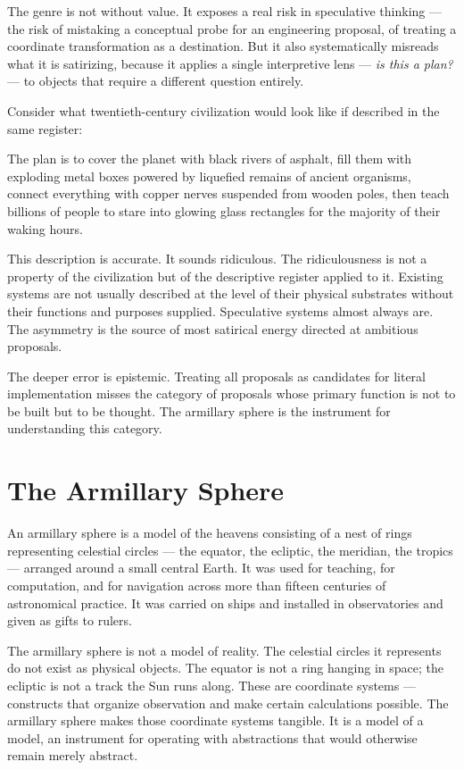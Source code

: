 \documentclass[12pt, a4paper]{article}
\theoremstyle{named}
\begin{document}
The genre is not without value. It exposes a real risk in speculative
thinking — the risk of mistaking a conceptual probe for an engineering
proposal, of treating a coordinate transformation as a destination. But
it also systematically misreads what it is satirizing, because it
applies a single interpretive lens — \emph{is this a plan?} — to
objects that require a different question entirely.

Consider what twentieth-century civilization would look like if
described in the same register:

\begin{keybox}
The plan is to cover the planet with black rivers of asphalt, fill them
with exploding metal boxes powered by liquefied remains of ancient
organisms, connect everything with copper nerves suspended from wooden
poles, then teach billions of people to stare into glowing glass
rectangles for the majority of their waking hours.
\end{keybox}

This description is accurate. It sounds ridiculous. The ridiculousness
is not a property of the civilization but of the descriptive register
applied to it. Existing systems are not usually described at the level
of their physical substrates without their functions and purposes
supplied. Speculative systems almost always are. The asymmetry is the
source of most satirical energy directed at ambitious proposals.

The deeper error is epistemic. Treating all proposals as candidates
for literal implementation misses the category of proposals whose
primary function is not to be built but to be thought. The armillary
sphere is the instrument for understanding this category.

\section{The Armillary Sphere}

An armillary sphere is a model of the heavens consisting of a nest of
rings representing celestial circles — the equator, the ecliptic, the
meridian, the tropics — arranged around a small central Earth. It was
used for teaching, for computation, and for navigation across more than
fifteen centuries of astronomical practice. It was carried on ships
and installed in observatories and given as gifts to rulers.

The armillary sphere is not a model of reality. The celestial circles
it represents do not exist as physical objects. The equator is not a
ring hanging in space; the ecliptic is not a track the Sun runs along.
These are coordinate systems — constructs that organize observation and
make certain calculations possible. The armillary sphere makes those
coordinate systems tangible. It is a model of a model, an instrument
for operating with abstractions that would otherwise remain merely
abstract.
\end{document}
